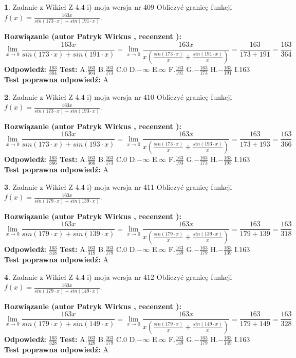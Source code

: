 \documentclass[12pt, a4paper]{article}
\theoremstyle{definition} %
\newtheorem{zad}{}
\newcommand{\zadStart}[1]{\begin{zad}#1\newline}
\newcommand{\zadStop}{\end{zad}}
\newcommand{\rozwStart}[2]{\noindent \textbf{Rozwiązanie (autor #1 , recenzent #2): }\newline}
\newcommand{\rozwStop}{\newline}
\newcommand{\odpStart}{\noindent \textbf{Odpowiedź:}\newline}
\newcommand{\odpStop}{\newline}
\newcommand{\testStart}{\noindent \textbf{Test:}\newline}
\newcommand{\testStop}{\newline}
\newcommand{\kluczStart}{\noindent \textbf{Test poprawna odpowiedź:}\newline}
\newcommand{\kluczStop}{\newline}
\begin{document}
\zadStart{Zadanie z Wikieł Z 4.4 i) moja wersja nr 409}
Obliczyć granicę funkcji $f(x)=\frac{163x}{sin(173\cdot x) +sin(191\cdot x)}$.
\zadStop
\rozwStart{Patryk Wirkus}{}
$$\lim\limits_{x\to 0}\frac{163x}{sin(173\cdot x) +sin(191\cdot x)}=\lim\limits_{x\to 0}\frac{163x}{x(\frac{sin(173\cdot x)}{x}+\frac{sin(191\cdot x)}{x})}=\frac{163}{173+191} = \frac{163}{364}$$
\rozwStop
\odpStart
$\frac{163}{364}$
\odpStop
\testStart
A.$\frac{163}{364}$
B.$\frac{163}{173}$
C.$0$
D.$-\infty$
E.$\infty$
F.$\frac{163}{191}$
G.$-\frac{163}{173}$
H.$-\frac{163}{191}$
I.$163$
\testStop
\kluczStart
A
\kluczStop



\zadStart{Zadanie z Wikieł Z 4.4 i) moja wersja nr 410}
Obliczyć granicę funkcji $f(x)=\frac{163x}{sin(173\cdot x) +sin(193\cdot x)}$.
\zadStop
\rozwStart{Patryk Wirkus}{}
$$\lim\limits_{x\to 0}\frac{163x}{sin(173\cdot x) +sin(193\cdot x)}=\lim\limits_{x\to 0}\frac{163x}{x(\frac{sin(173\cdot x)}{x}+\frac{sin(193\cdot x)}{x})}=\frac{163}{173+193} = \frac{163}{366}$$
\rozwStop
\odpStart
$\frac{163}{366}$
\odpStop
\testStart
A.$\frac{163}{366}$
B.$\frac{163}{173}$
C.$0$
D.$-\infty$
E.$\infty$
F.$\frac{163}{193}$
G.$-\frac{163}{173}$
H.$-\frac{163}{193}$
I.$163$
\testStop
\kluczStart
A
\kluczStop



\zadStart{Zadanie z Wikieł Z 4.4 i) moja wersja nr 411}
Obliczyć granicę funkcji $f(x)=\frac{163x}{sin(179\cdot x) +sin(139\cdot x)}$.
\zadStop
\rozwStart{Patryk Wirkus}{}
$$\lim\limits_{x\to 0}\frac{163x}{sin(179\cdot x) +sin(139\cdot x)}=\lim\limits_{x\to 0}\frac{163x}{x(\frac{sin(179\cdot x)}{x}+\frac{sin(139\cdot x)}{x})}=\frac{163}{179+139} = \frac{163}{318}$$
\rozwStop
\odpStart
$\frac{163}{318}$
\odpStop
\testStart
A.$\frac{163}{318}$
B.$\frac{163}{179}$
C.$0$
D.$-\infty$
E.$\infty$
F.$\frac{163}{139}$
G.$-\frac{163}{179}$
H.$-\frac{163}{139}$
I.$163$
\testStop
\kluczStart
A
\kluczStop



\zadStart{Zadanie z Wikieł Z 4.4 i) moja wersja nr 412}
Obliczyć granicę funkcji $f(x)=\frac{163x}{sin(179\cdot x) +sin(149\cdot x)}$.
\zadStop
\rozwStart{Patryk Wirkus}{}
$$\lim\limits_{x\to 0}\frac{163x}{sin(179\cdot x) +sin(149\cdot x)}=\lim\limits_{x\to 0}\frac{163x}{x(\frac{sin(179\cdot x)}{x}+\frac{sin(149\cdot x)}{x})}=\frac{163}{179+149} = \frac{163}{328}$$
\rozwStop
\odpStart
$\frac{163}{328}$
\odpStop
\testStart
A.$\frac{163}{328}$
B.$\frac{163}{179}$
C.$0$
D.$-\infty$
E.$\infty$
F.$\frac{163}{149}$
G.$-\frac{163}{179}$
H.$-\frac{163}{149}$
I.$163$
\testStop
\kluczStart
A
\kluczStop
\end{document}
